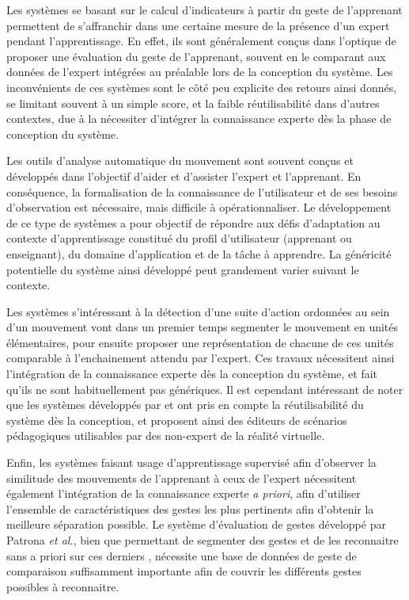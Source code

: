 Les systèmes se basant sur le calcul d'indicateurs à partir du geste de l'apprenant permettent de s'affranchir dans une certaine mesure de la présence d'un expert pendant l'apprentissage. En effet, ils sont généralement conçus dans l'optique de proposer une évaluation du geste de l'apprenant, souvent en le comparant aux données de l'expert intégrées au préalable lors de la conception du système. Les inconvénients de ces systèmes sont le côté peu explicite des retours ainsi donnés, se limitant souvent à un simple score, et la faible réutilisabilité dans d'autres contextes, due à la nécessiter d'intégrer la connaissance experte dès la phase de conception du système.

Les outils d'analyse automatique du mouvement sont souvent conçus et développés dans l'objectif d'aider et d'assister l'expert et l'apprenant. En conséquence, la formalisation de la connaissance de l'utilisateur et de ses besoins d'observation est nécessaire, mais difficile à opérationnaliser. Le développement de ce type de systèmes a pour objectif de répondre aux défis d'adaptation au contexte d'apprentissage constitué du profil d'utilisateur (apprenant ou enseignant), du domaine d'application et de la tâche à apprendre. La généricité potentielle du système ainsi développé peut grandement varier suivant le contexte.

Les systèmes s'intéressant à la détection d'une suite d'action ordonnées au sein d'un mouvement vont dans un premier temps segmenter le mouvement en unités élémentaires, pour ensuite proposer une représentation de chacune de ces unités comparable à l'enchainement attendu par l'expert. Ces travaux nécessitent ainsi l'intégration de la connaissance experte dès la conception du système, et fait qu'ils ne sont habituellement pas génériques. Il est cependant intéressant de noter que les systèmes développés par \parencite{Mahdi2019TaE} et \parencite{Delest2019MaE} ont pris en compte la réutilisabilité du système dès la conception, et proposent ainsi des éditeurs de scénarios pédagogiques utilisables par des non-expert de la réalité virtuelle.

Enfin, les systèmes faisant usage d'apprentissage supervisé afin d'observer la similitude des mouvements de l'apprenant à ceux de l'expert nécessitent également l'intégration de la connaissance experte \textit{a priori}, afin d'utiliser l'ensemble de caractéristiques des gestes les plus pertinents afin d'obtenir la meilleure séparation possible. Le système d'évaluation de gestes développé par Patrona \textit{et al.}, bien que permettant de segmenter des gestes et de les reconnaitre sans a priori sur ces derniers \parencite{Patrona2018MaA}, nécessite une base de données de geste de comparaison suffisamment importante afin de couvrir les différents gestes possibles à reconnaitre.

